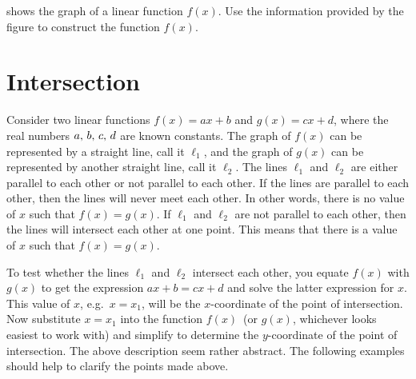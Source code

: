 \documentclass[a4paper,oneside,12pt]{article}
\begin{document}
\begin{exercise}
 shows the graph of a linear function
$f(x)$.  Use the information provided by the figure to construct the
function $f(x)$.
\end{exercise}



\section{Intersection}

Consider two linear functions $f(x) = ax + b$ and $g(x) = cx + d$,
where the real numbers ${a},\, {b},\, {c},\, {d}$ are known constants.
The graph of $f(x)$ can be represented by a straight line, call it
$\ell_1$, and the graph of $g(x)$ can be represented by another
straight line, call it $\ell_2$.  The lines $\ell_1$ and $\ell_2$ are
either parallel to each other or not parallel to each other.  If the
lines are parallel to each other, then the lines will never meet each
other.  In other words, there is no value of $x$ such that
$f(x) = g(x)$.  If $\ell_1$ and $\ell_2$ are not parallel to each
other, then the lines will intersect each other at one point.  This
means that there is a value of $x$ such that $f(x) = g(x)$.

To test whether the lines $\ell_1$ and $\ell_2$ intersect each other,
you equate $f(x)$ with $g(x)$ to get the expression $ax + b = cx + d$
and solve the latter expression for $x$.  This value of $x$,
e.g.~$x = x_1$, will be the $x$-coordinate of the point of
intersection.  Now substitute $x = x_1$ into the function $f(x)$~(or
$g(x)$, whichever looks easiest to work with) and simplify to
determine the $y$-coordinate of the point of intersection.  The above
description seem rather abstract.  The following examples should help
to clarify the points made above.
\end{document}
